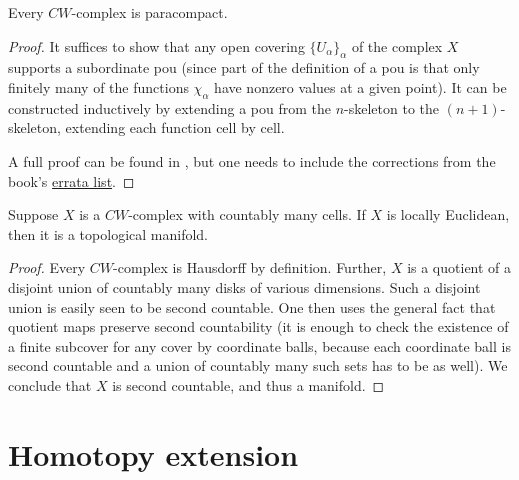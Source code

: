 \begin{thm}
    Every $CW$-complex is paracompact.
\end{thm}
\begin{proof}
    It suffices to show that any open covering $\{U_\alpha\}_\alpha$ of the complex $X$ supports a subordinate \gls{pou} (since part of the definition of a \gls{pou} is that only finitely many of the functions $\chi_\alpha$ have nonzero values at a given point). It can be constructed inductively by extending a \gls{pou} from the $n$-skeleton to the $(n+1)$-skeleton, extending each function cell by cell.
    
    A full proof can be found in \cite[Thm.~5.22]{LeeTop}, but one needs to include the corrections from the book's \href{https://sites.math.washington.edu//~lee/Books/ITM/errata.pdf}{errata list}. 
\end{proof}

\begin{prop}
    Suppose $X$ is a $CW$-complex with countably many cells. If $X$ is locally Euclidean, then it is a topological manifold.
\end{prop}
\begin{proof}
    Every $CW$-complex is Hausdorff by definition. Further, $X$ is a quotient of a disjoint union of countably many disks of various dimensions. Such a disjoint union is easily seen to be second countable. One then uses the general fact that quotient maps preserve second countability (it is enough to check the existence of a finite subcover for any cover by coordinate balls, because each coordinate ball is second countable and a union of countably many such sets has to be as well). We conclude that $X$ is second countable, and thus a manifold.
\end{proof}




\section{Homotopy extension}\label{sec: homotopy extension}

